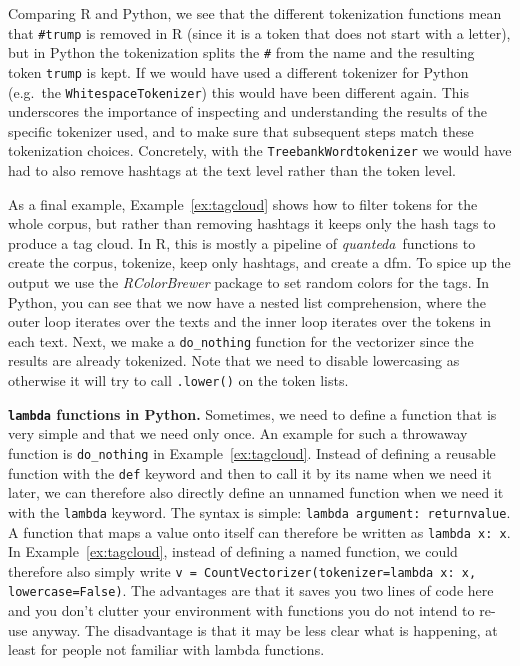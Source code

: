 Comparing R and Python, we see that the different tokenization functions mean that \verb|#trump| is removed in R (since it is a token that does not start with a letter),
but in Python the tokenization splits the \verb|#| from the name and the resulting token \verb|trump| is kept.
If we would have used a different tokenizer for Python (e.g.\ the \texttt{WhitespaceTokenizer}) this would have been different again.
This underscores the importance of inspecting and understanding the results of the specific tokenizer used,
and to make sure that subsequent steps match these tokenization choices.
Concretely, with the \texttt{TreebankWordtokenizer} we would have had to also remove hashtags at the text level rather than the token level.


As a final example, Example~\ref{ex:tagcloud} shows how to filter tokens for the whole corpus, but rather than removing hashtags it keeps only the hash tags to produce a tag cloud.
In R, this is mostly a pipeline of \emph{quanteda}\ functions to create the corpus, tokenize, keep only hashtags, and create a dfm.
To spice up the output we use the \emph{RColorBrewer} package to set random colors for the tags.
In Python, you can see that we now have a nested list comprehension, where the outer loop iterates over the texts and the inner loop iterates over the tokens in each text.
Next, we make a \verb|do_nothing| function for the vectorizer since the results are already tokenized.
Note that we need to disable lowercasing as otherwise it will try to call \verb|.lower()| on the token lists.

\begin{feature}
  \textbf{\texttt{lambda} functions in Python.}
  Sometimes, we need to define a function that is very simple and that we need only once.
  An example for such a throwaway function is \verb|do_nothing| in Example~\ref{ex:tagcloud}.
  Instead of defining a reusable function with the \texttt{def} keyword and then to call it by its name when we need it later,
  we can therefore also directly define an unnamed function when we need it with the \texttt{lambda} keyword.
  The syntax is simple: \verb|lambda argument: returnvalue|.
  A function that maps a value onto itself can therefore be written as \verb|lambda x: x|.
  In Example~\ref{ex:tagcloud}, instead of defining a named function,
  we could therefore also simply write \verb|v = CountVectorizer(tokenizer=lambda x: x, lowercase=False)|.
  The advantages are that it saves you two lines of code here and  you don't clutter your environment with functions you do not intend to re-use anyway.
  The disadvantage is that it may be less clear what is happening, at least for people not familiar with lambda functions.
\end{feature}




